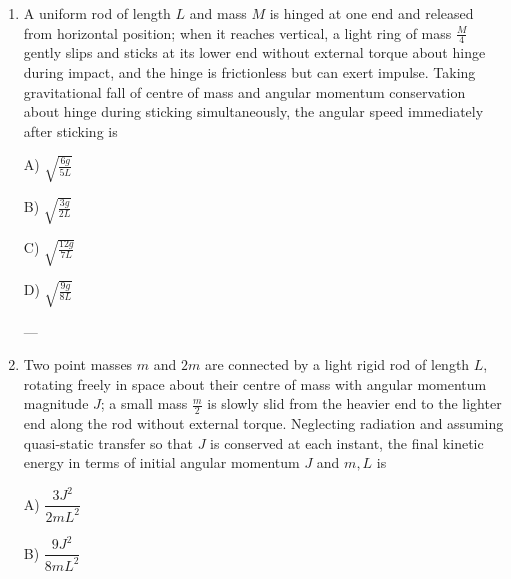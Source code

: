 \documentclass[12pt]{article}
\begin{document}
\begin{enumerate}[leftmargin=*]

\item A uniform rod of length \(L\) and mass \(M\) is hinged at one end and released from horizontal position; when it reaches vertical, a light ring of mass \(\frac{M}{4}\) gently slips and sticks at its lower end without external torque about hinge during impact, and the hinge is frictionless but can exert impulse. Taking gravitational fall of centre of mass and angular momentum conservation about hinge during sticking simultaneously, the angular speed immediately after sticking is  


\begin{center}
\end{center}

A) \(\sqrt{\frac{6g}{5L}}\)  

B) \(\sqrt{\frac{3g}{2L}}\)  

C) \(\sqrt{\frac{12g}{7L}}\)  

D) \(\sqrt{\frac{9g}{8L}}\)  

---

\item Two point masses \(m\) and \(2m\) are connected by a light rigid rod of length \(L\), rotating freely in space about their centre of mass with angular momentum magnitude \(J\); a small mass \(\frac{m}{2}\) is slowly slid from the heavier end to the lighter end along the rod without external torque. Neglecting radiation and assuming quasi-static transfer so that \(J\) is conserved at each instant, the final kinetic energy in terms of initial angular momentum \(J\) and \(m,L\) is  

A) \(\dfrac{3J^2}{2mL^2}\)  

B) \(\dfrac{9J^2}{8mL^2}\)  


\end{enumerate}
\end{document}
